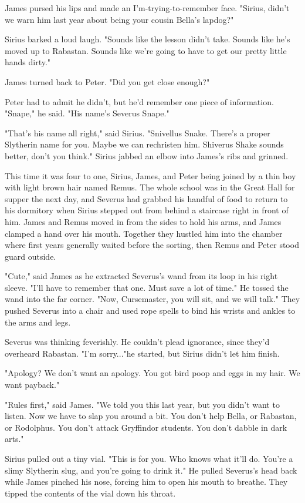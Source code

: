 \documentclass[a4paper,11pt]{article}
\begin{document}
James pursed his lips and made an I'm-trying-to-remember face. "Sirius, didn't we warn him last year about being your cousin Bella's lapdog?"

Sirius barked a loud laugh. "Sounds like the lesson didn't take. Sounds like he's moved up to Rabastan. Sounds like we're going to have to get our pretty little hands dirty."

James turned back to Peter. "Did you get close enough?"

Peter had to admit he didn't, but he'd remember one piece of information. "Snape," he said. "His name's Severus Snape."

"That's his name all right," said Sirius. "Snivellus Snake. There's a proper Slytherin name for you. Maybe we can rechristen him. Shiverus Shake sounds better, don't you think." Sirius jabbed an elbow into James's ribs and grinned.

This time it was four to one, Sirius, James, and Peter being joined by a thin boy with light brown hair named Remus. The whole school was in the Great Hall for supper the next day, and Severus had grabbed his handful of food to return to his dormitory when Sirius stepped out from behind a staircase right in front of him. James and Remus moved in from the sides to hold his arms, and James clamped a hand over his mouth. Together they hustled him into the chamber where first years generally waited before the sorting, then Remus and Peter stood guard outside.

"Cute," said James as he extracted Severus's wand from its loop in his right sleeve. "I'll have to remember that one. Must save a lot of time." He tossed the wand into the far corner. "Now, Cursemaster, you will sit, and we will talk." They pushed Severus into a chair and used rope spells to bind his wrists and ankles to the arms and legs.

Severus was thinking feverishly. He couldn't plead ignorance, since they'd overheard Rabastan. "I'm sorry..."he started, but Sirius didn't let him finish.

"Apology? We don't want an apology. You got bird poop and eggs in my hair. We want payback."

"Rules first," said James. "We told you this last year, but you didn't want to listen. Now we have to slap you around a bit. You don't help Bella, or Rabastan, or Rodolphus. You don't attack Gryffindor students. You don't dabble in dark arts."

Sirius pulled out a tiny vial. "This is for you. Who knows what it'll do. You're a slimy Slytherin slug, and you're going to drink it." He pulled Severus's head back while James pinched his nose, forcing him to open his mouth to breathe. They tipped the contents of the vial down his throat.
\end{document}
